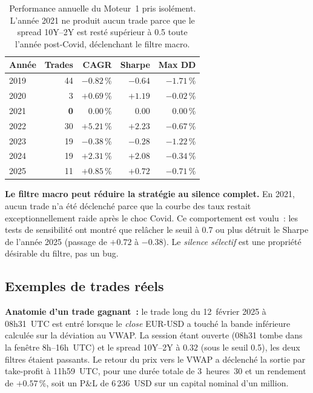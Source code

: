 \begin{table}[H]
\centering
\caption{Performance annuelle du Moteur~1 pris isolément. L'année 2021 ne produit aucun trade parce que le spread 10Y--2Y est resté supérieur à 0.5 toute l'année post-Covid, déclenchant le filtre macro.}
\renewcommand{\arraystretch}{1.1}
\begin{tabular}{lrrrr}
\toprule
\textbf{Année} & \textbf{Trades} & \textbf{CAGR} & \textbf{Sharpe} & \textbf{Max DD} \\
\midrule
2019 & 44 & $-0.82$\,\% & $-0.64$ & $-1.71$\,\% \\
2020 & 3 & $+0.69$\,\% & $+1.19$ & $-0.02$\,\% \\
2021 & \textbf{0} & $0.00$\,\% & $0.00$ & $0.00$\,\% \\
2022 & 30 & $+5.21$\,\% & \textbf{$+2.23$} & $-0.67$\,\% \\
2023 & 19 & $-0.38$\,\% & $-0.28$ & $-1.22$\,\% \\
2024 & 19 & $+2.31$\,\% & \textbf{$+2.08$} & $-0.34$\,\% \\
2025 & 11 & $+0.85$\,\% & $+0.72$ & $-0.71$\,\% \\
\bottomrule
\end{tabular}
\end{table}

\begin{warningbox}
\textbf{Le filtre macro peut réduire la stratégie au silence complet.} En 2021, aucun trade n'a été déclenché parce que la courbe des taux restait exceptionnellement raide après le choc Covid. Ce comportement est voulu~: les tests de sensibilité ont montré que relâcher le seuil à 0.7 ou plus détruit le Sharpe de l'année 2025 (passage de $+0.72$ à $-0.38$). Le \emph{silence sélectif} est une propriété désirable du filtre, pas un bug.
\end{warningbox}

\subsection{Exemples de trades réels}



\begin{examplebox}
\textbf{Anatomie d'un trade gagnant~:} le trade long du 12~février 2025 à 08h31~UTC est entré lorsque le \emph{close} EUR-USD a touché la bande inférieure calculée sur la déviation au VWAP. La session étant ouverte (08h31 tombe dans la fenêtre 8h--16h~UTC) et le spread 10Y--2Y à $0.32$ (sous le seuil 0.5), les deux filtres étaient passants. Le retour du prix vers le VWAP a déclenché la sortie par take-profit à 11h59~UTC, pour une durée totale de 3~heures~30 et un rendement de $+0.57\,\%$, soit un P\&L de 6\,236~USD sur un capital nominal d'un million.
\end{examplebox}
